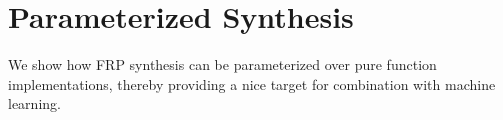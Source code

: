 \section{Parameterized Synthesis}

We show how FRP synthesis can be parameterized over pure function implementations, thereby providing a nice target for combination with machine learning.
